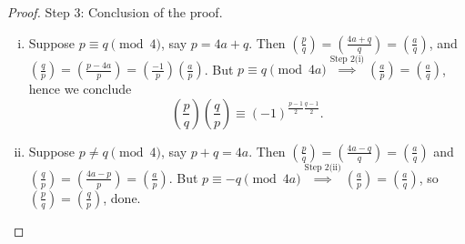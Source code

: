 \documentclass{article}
\theoremstyle{definition}
\begin{document}
\begin{proof}
    Step 3: Conclusion of the proof. 
    \begin{enumerate}[(i)]
        \item Suppose $p \equiv q \pmod{4}$, say $p = 4a +q$. Then $\left(\frac{p}{q} \right) = \left(\frac{4a+q}{q} \right) = \left(\frac{a}{q} \right)$, and $\left(\frac{q}{p} \right) = \left(\frac{p-4a}{p} \right) = \left(\frac{-1}{p} \right) \left(\frac{a}{p} \right) $. But $p \equiv q \pmod{4a}\stackrel{\text{Step 2(i)}}{\implies} \left(\frac{a}{p} \right) =\left(\frac{a}{q} \right)$, hence we conclude 
        \[
            \left(\frac{p}{q}\right)\left(\frac{q}{p}\right) \equiv (-1)^{\frac{p-1}{2}\frac{q-1}{2}}.
        \]
        \item Suppose $p \neq q \pmod{4}$, say $p+q = 4a$. Then $\left(\frac{p}{q} \right) = \left(\frac{4a-q}{q} \right) = \left(\frac{a}{q} \right)$ and $\left(\frac{q}{p}  \right) = \left(\frac{4a-p}{p} \right) = \left(\frac{a}{p} \right)$. But $p \equiv -q \pmod{4a} \stackrel{\text{Step 2(ii)}}{\implies} \left(\frac{a}{p} \right) = \left(\frac{a}{q} \right)$, so $\left(\frac{p}{q} \right) =\left(\frac{q}{p} \right)$, done.
    \end{enumerate}
\end{proof}
\end{document}
